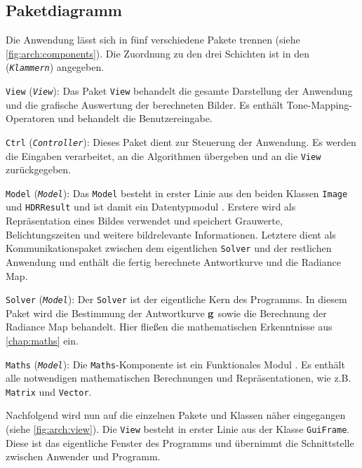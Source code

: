 \subsection{Paketdiagramm}
Die Anwendung lässt sich in fünf verschiedene Pakete trennen (siehe \autoref{fig:arch:components}). Die Zuordnung zu den drei Schichten ist in den (\textit{\texttt{Klammern}}) angegeben.
\begin{description}



\item{\texttt{View} (\textit{\texttt{View}}):} Das Paket \texttt{View} behandelt die gesamte Darstellung der Anwendung und die grafische Auswertung der berechneten Bilder. Es enthält \gls{Tone-Mapping}-Operatoren und behandelt die Benutzereingabe.

\item{\texttt{Ctrl} (\textit{\texttt{Controller}}):} Dieses Paket dient zur Steuerung der Anwendung. Es werden die Eingaben verarbeitet, an die Algorithmen übergeben und an die \texttt{View} zurückgegeben.

\item{\texttt{Model} (\textit{\texttt{Model}}):} Das \texttt{Model} besteht in erster Linie aus den beiden Klassen \texttt{Image} und \texttt{HDRResult} und ist damit ein Datentypmodul \cite[S. 412]{ludewig}. Erstere wird als Repräsentation eines Bildes verwendet und speichert Grauwerte, Belichtungszeiten und weitere bildrelevante Informationen. Letztere dient als Kommunikationspaket zwischen dem eigentlichen \texttt{Solver} und der restlichen Anwendung und enthält die fertig berechnete Antwortkurve und die \gls{Radiance Map}. 

\item{\texttt{Solver} (\textit{\texttt{Model}}):} Der \texttt{Solver} ist der eigentliche Kern des Programms. In diesem Paket wird die Bestimmung der Antwortkurve $\mathbf g$ sowie die Berechnung der \gls{Radiance Map} behandelt. Hier fließen die mathematischen Erkenntnisse aus \autoref{chap:maths} ein. 

\item{\texttt{Maths} (\textit{\texttt{Model}}):} Die \texttt{Maths}-Komponente ist ein Funktionales Modul \cite[S. 412]{ludewig}. Es enthält alle notwendigen mathematischen Berechnungen und Repräsentationen, wie z.B. \texttt{Matrix} und \texttt{Vector}.
\end{description}


Nachfolgend wird nun auf die einzelnen Pakete und Klassen näher eingegangen (siehe \autoref{fig:arch:view}). Die \texttt{View} besteht in erster Linie aus der Klasse \texttt{GuiFrame}. Diese ist das eigentliche Fenster des Programms und übernimmt die Schnittstelle zwischen Anwender und Programm. 

